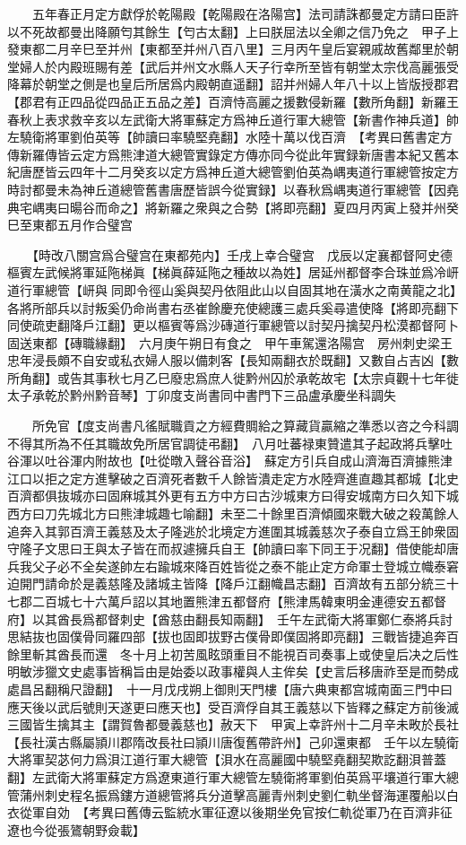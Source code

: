 　　五年春正月定方獻俘於乾陽殿【乾陽殿在洛陽宫】法司請誅都曼定方請曰臣許以不死故都曼出降願匄其餘生【匄古太翻】上曰朕屈法以全卿之信乃免之　甲子上發東都二月辛巳至并州【東都至并州八百八里】三月丙午皇后宴親戚故舊鄰里於朝堂婦人於内殿班賜有差【武后并州文水縣人天子行幸所至皆有朝堂太宗伐高麗張受降幕於朝堂之側是也皇后所居爲内殿朝直遥翻】詔并州婦人年八十以上皆版授郡君【郡君有正四品從四品正五品之差】百濟恃高麗之援數侵新羅【數所角翻】新羅王春秋上表求救辛亥以左武衛大將軍蘇定方爲神丘道行軍大總管【新書作神兵道】帥左驍衛將軍劉伯英等【帥讀曰率驍堅堯翻】水陸十萬以伐百濟　【考異曰舊書定方傳新羅傳皆云定方爲熊津道大總管實錄定方傳亦同今從此年實録新唐書本紀又舊本紀唐歷皆云四年十二月癸亥以定方爲神丘道大總管劉伯英為嵎夷道行軍總管按定方時討都曼未為神丘道總管舊書唐歷皆誤今從實録】以春秋爲嵎夷道行軍總管【因堯典宅嵎夷曰暘谷而命之】將新羅之衆與之合勢【將即亮翻】夏四月丙寅上發并州癸巳至東都五月作合璧宫

　　【時改八關宫爲合璧宫在東都苑内】壬戌上幸合璧宫　戊辰以定襄都督阿史德樞賓左武候將軍延陁梯眞【梯眞薛延陁之種故以為姓】居延州都督李合珠並爲冷岍道行軍總管【岍與同即令徑山奚與契丹依阻此山以自固其地在潢水之南黄龍之北】各將所部兵以討叛奚仍命尚書右丞崔餘慶充使總護三處兵奚尋遣使降【將即亮翻下同使疏吏翻降戶江翻】更以樞賓等爲沙磚道行軍總管以討契丹擒契丹松漠都督阿卜固送東都【磚職緣翻】　六月庚午朔日有食之　甲午車駕還洛陽宫　房州刺史梁王忠年浸長頗不自安或私衣婦人服以備刺客【長知兩翻衣於既翻】又數自占吉凶【數所角翻】或告其事秋七月乙巳廢忠爲庶人徙黔州囚於承乾故宅【太宗貞觀十七年徙太子承乾於黔州黔音琴】丁卯度支尚書同中書門下三品盧承慶坐科調失

　　所免官【度支尚書凡徭賦職貢之方經費賙給之算藏貨贏縮之準悉以咨之今科調不得其所為不任其職故免所居官調徒弔翻】　八月吐蕃禄東贊遣其子起政將兵擊吐谷渾以吐谷渾内附故也【吐從暾入聲谷音浴】　蘇定方引兵自成山濟海百濟據熊津江口以拒之定方進擊破之百濟死者數千人餘皆潰走定方水陸齊進直趣其都城【北史百濟都俱抜城亦曰固麻城其外更有五方中方曰古沙城東方曰得安城南方曰久知下城西方曰刀先城北方曰熊津城趣七喻翻】未至二十餘里百濟傾國來戰大破之殺萬餘人追奔入其郭百濟王義慈及太子隆逃於北境定方進圍其城義慈次子泰自立爲王帥衆固守隆子文思曰王與太子皆在而叔遽擁兵自王【帥讀曰率下同王于况翻】借使能却唐兵我父子必不全矣遂帥左右踰城來降百姓皆從之泰不能止定方命軍士登城立幟泰窘迫開門請命於是義慈隆及諸城主皆降【降戶江翻幟昌志翻】百濟故有五部分統三十七郡二百城七十六萬戶詔以其地置熊津五都督府【熊津馬韓東明金連德安五都督府】以其酋長爲都督刺史【酋慈由翻長知兩翻】　壬午左武衛大將軍鄭仁泰將兵討思結抜也固僕骨同羅四部【拔也固即拔野古僕骨即僕固將即亮翻】三戰皆捷追奔百餘里斬其酋長而還　冬十月上初苦風眩頭重目不能視百司奏事上或使皇后决之后性明敏涉獵文史處事皆稱旨由是始委以政事權與人主侔矣【史言后移唐祚至是而勢成處昌呂翻稱尺證翻】　十一月戊戌朔上御則天門樓【唐六典東都宫城南面三門中曰應天後以武后號則天遂更曰應天也】受百濟俘自其王義慈以下皆釋之蘇定方前後滅三國皆生擒其主【謂賀魯都曼義慈也】赦天下　甲寅上幸許州十二月辛未畋於長社【長社漢古縣屬頴川郡隋改長社曰頴川唐復舊帶許州】己卯還東都　壬午以左驍衛大將軍契苾何力爲浿江道行軍大總管【浿水在高麗國中驍堅堯翻契欺訖翻浿普蓋翻】左武衛大將軍蘇定方爲遼東道行軍大總管左驍衛將軍劉伯英爲平壤道行軍大總管蒲州刺史程名振爲鏤方道總管將兵分道擊高麗青州刺史劉仁軌坐督海運覆船以白衣從軍自効　【考異曰舊傳云監統水軍征遼以後期坐免官按仁軌從軍乃在百濟非征遼也今從張鷟朝野僉載】


